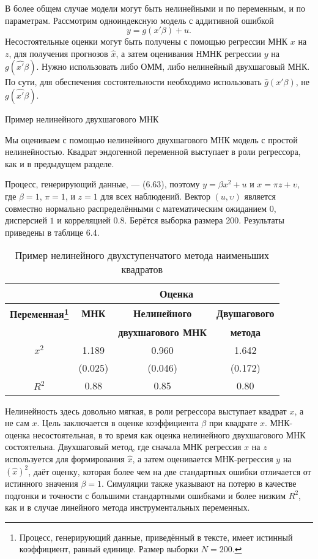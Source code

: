 В более общем случае модели могут быть нелинейными и по переменным, и по параметрам. Рассмотрим одноиндексную модель с аддитивной ошибкой
\[
y=g(x'\beta)+u.
\]
Несостоятельные оценки могут быть получены с помощью регрессии МНК $x$ на $z$, для получения прогнозов $\hat{x}$, а затем оценивания НМНК регрессии $y$ на $g(\hat{x'}\beta)$. Нужно использовать либо ОММ, либо нелинейный двухшаговый МНК. По сути, для обеспечения состоятельности необходимо использовать $\hat{g}(x'\beta)$, не $g(\hat{x'}\beta)$.

\begin{center}
Пример нелинейного двухшагового МНК
\end{center}

Мы оцениваем с помощью нелинейного двухшагового МНК модель с простой нелинейностью. Квадрат эндогенной переменной выступает в роли регрессора, как и в предыдущем разделе.

Процесс, генерирующий данные, --- (6.63), поэтому $y=\beta x^2 + u$ и $x=\pi z + \upsilon$, где $\beta=1$, $\pi=1$, и $z=1$ для всех наблюдений. Вектор $(u,\upsilon)$ является совместно нормально распределёнными с математическим ожиданием $0$, дисперсией $1$ и корреляцией $0.8$. Берётся выборка размера 200. Результаты приведены в таблице 6.4.

\begin{table}[h]
\begin{center}
\caption{\label{tab:GMMestnlex} Пример нелинейного двухступенчатого метода наименьших квадратов}
\begin{minipage}{12.5cm}
\begin{tabular}[t]{cccc}
\hline
\hline
& \multicolumn{3}{c}{\bf{Оценка}} \\
\hline
\bf{Переменная}\footnote{Процесс, генерирующий данные, приведённый в тексте, имеет истинный коэффициент, равный единице. Размер выборки $N=200$.} & \bf{МНК} & \bf{Нелинейного} & \bf{Двушагового} \\
 & & \bf{двухшагового МНК} & \bf{метода} \\
\hline
$x^2$ & 1.189 & 0.960 & 1.642 \\
 & (0.025) & (0.046) & (0.172) \\
$R^2$ & 0.88 & 0.85 & 0.80 \\
\hline
\hline
\end{tabular}
\end{minipage}
\end{center}
\end{table}

Нелинейность здесь довольно мягкая, в роли регрессора выступает квадрат $x$, а не сам $x$. Цель заключается в оценке коэффициента $\beta$ при квадрате $x$. МНК-оценка несостоятельная, в то время как оценка нелинейного двухшагового МНК состоятельна. Двухшаговый метод, где сначала МНК регрессия $x$ на $z$ используется для формирования $\hat{x}$, а затем оценивается МНК-регрессия $y$ на $(\hat{x})^2$, даёт оценку, которая более чем на две стандартных ошибки отличается от истинного значения $\beta=1$. Симуляции также указывают на потерю в качестве подгонки и точности с большими стандартными ошибками и более низким $R^2$, как и в случае линейного метода инструментальных переменных.

